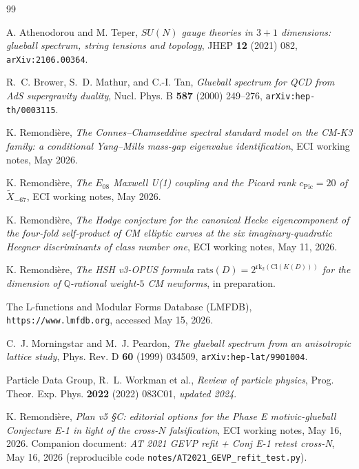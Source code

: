\documentclass[11pt,a4paper]{amsart}
\providecommand{\Q}{\mathbb{Q}}
\theoremstyle{definition}
\begin{document}

\begin{thebibliography}{99}

A. Athenodorou and M. Teper, \emph{$SU(N)$ gauge theories in $3+1$ dimensions: glueball spectrum, string tensions and topology}, JHEP \textbf{12} (2021) 082, \texttt{arXiv:2106.00364}.

R.~C. Brower, S.~D. Mathur, and C.-I. Tan, \emph{Glueball spectrum for QCD from AdS supergravity duality}, Nucl. Phys. B \textbf{587} (2000) 249--276, \texttt{arXiv:hep-th/0003115}.

K. Remondière, \emph{The Connes--Chamseddine spectral standard model on the CM-K3 family: a conditional Yang--Mills mass-gap eigenvalue identification}, ECI working notes, May 2026.

K. Remondière, \emph{The $E_{08}$ Maxwell U(1) coupling and the Picard rank $c_{\mathrm{Pic}} = 20$ of $\widetilde X_{-67}$}, ECI working notes, May 2026.

K. Remondière, \emph{The Hodge conjecture for the canonical Hecke eigencomponent of the four-fold self-product of CM elliptic curves at the six imaginary-quadratic Heegner discriminants of class number one}, ECI working notes, May 11, 2026.

K. Remondière, \emph{The HSH v3-OPUS formula $\mathrm{rats}(D) = 2^{\mathrm{rk}_{2}(\mathrm{Cl}(K(D)))}$ for the dimension of $\Q$-rational weight-$5$ CM newforms}, in preparation.

The L-functions and Modular Forms Database (LMFDB), \texttt{https://www.lmfdb.org}, accessed May 15, 2026.

C.~J. Morningstar and M.~J. Peardon, \emph{The glueball spectrum from an anisotropic lattice study}, Phys. Rev. D \textbf{60} (1999) 034509, \texttt{arXiv:hep-lat/9901004}.

Particle Data Group, R.~L. Workman et al., \emph{Review of particle physics}, Prog. Theor. Exp. Phys. \textbf{2022} (2022) 083C01, \emph{updated 2024}.

K. Remondière, \emph{Plan v5 \S C: editorial options for the Phase E motivic-glueball Conjecture E-1 in light of the cross-$N$ falsification}, ECI working notes, May 16, 2026. Companion document: \emph{AT 2021 GEVP refit + Conj E-1 retest cross-N}, May 16, 2026 (reproducible code \texttt{notes/AT2021\_GEVP\_refit\_test.py}).


\end{thebibliography}
\end{document}
